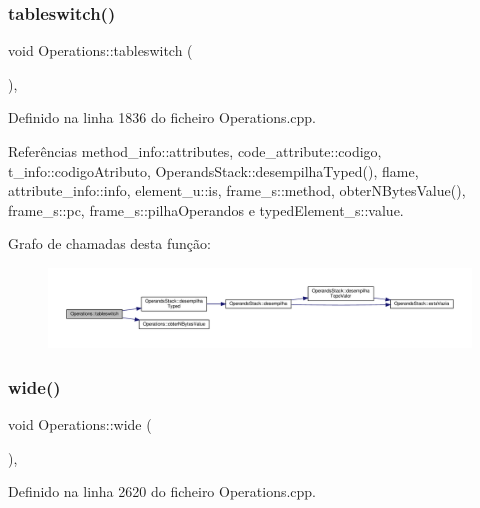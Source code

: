 \subsubsection{\texorpdfstring{tableswitch()}{tableswitch()}}
{\footnotesize\ttfamily void Operations\+::tableswitch (\begin{DoxyParamCaption}{ }\end{DoxyParamCaption})\hspace{0.3cm}{\ttfamily [static]}, {\ttfamily [private]}}



Definido na linha 1836 do ficheiro Operations.\+cpp.



Referências method\+\_\+info\+::attributes, code\+\_\+attribute\+::codigo, t\+\_\+info\+::codigo\+Atributo, Operands\+Stack\+::desempilha\+Typed(), flame, attribute\+\_\+info\+::info, element\+\_\+u\+::is, frame\+\_\+s\+::method, obter\+N\+Bytes\+Value(), frame\+\_\+s\+::pc, frame\+\_\+s\+::pilha\+Operandos e typed\+Element\+\_\+s\+::value.

Grafo de chamadas desta função\+:
\nopagebreak
\begin{figure}[H]
\begin{center}
\leavevmode
\includegraphics[width=350pt]{classOperations_a72955f43cde98b73c503e1a8c1505352_cgraph}
\end{center}
\end{figure}
\mbox{\label{classOperations_ab1474dfc4eb5142361b00d185f0a4a2b}} 
\subsubsection{\texorpdfstring{wide()}{wide()}}
{\footnotesize\ttfamily void Operations\+::wide (\begin{DoxyParamCaption}{ }\end{DoxyParamCaption})\hspace{0.3cm}{\ttfamily [static]}, {\ttfamily [private]}}



Definido na linha 2620 do ficheiro Operations.\+cpp.



